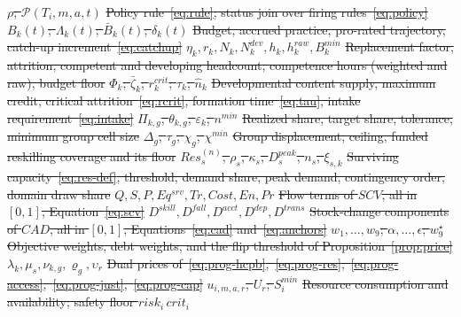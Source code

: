 \documentclass[utf8]{FrontiersinHarvard}
\providecommand{\DIFdel}[1]{{\protect\color{red}\sout{#1}}}                      %
\providecommand{\DIFdelFL}[1]{\DIFdel{#1}} %
\begin{document}
\DIFdelFL{$\rho$; $\mathcal{P}(T_i,m,a,t)$ }%
\DIFdelFL{Policy rule~\eqref{eq:rule}; status join over firing rules~\eqref{eq:policy}}%
\DIFdelFL{$B_k(t)$; $\Lambda_k(t)$; $\bar B_k(t)$; $\delta_k(t)$ }%
\DIFdelFL{Budget, accrued practice, pro-rated trajectory, catch-up increment~\eqref{eq:catchup}}%
\DIFdelFL{$\eta_k, r_k, N_k, N^{dev}_k, h_k, h^{raw}_k, B^{min}_k$ }%
\DIFdelFL{Replacement factor, attrition, competent and developing headcount, competence hours (weighted and raw), budget floor}%
\DIFdelFL{$\Phi_k$; $\bar\zeta_k$; $r^{crit}_k$; $\tau_k$; $\hat n_k$ }%
\DIFdelFL{Developmental content supply, maximum credit, critical attrition~\eqref{eq:rcrit}, formation time~\eqref{eq:tau}, intake requirement~\eqref{eq:intake}}%
\DIFdelFL{$\Pi_{k,g}$, $\theta_{k,g}$, $\varepsilon_k$, $n^{min}$ }%
\DIFdelFL{Realized share, target share, tolerance, minimum group cell size}%
\DIFdelFL{$\Delta_g$, $\tau_g$, $\chi_g$, $\chi^{min}$ }%
\DIFdelFL{Group displacement, ceiling, funded reskilling coverage and its floor}%
\DIFdelFL{$Res^{(n)}_s$, $\rho_s$, $\kappa_s$, $D^{peak}_s$, $n_s$, $\xi_{s,k}$ }%
\DIFdelFL{Surviving capacity~\eqref{eq:res-def}, threshold, demand share, peak demand, contingency order, domain draw share}%
\DIFdelFL{$Q,S,P,Eq^{srv},Tr,Cost,En,Pr$ }%
\DIFdelFL{Flow terms of $SCV$, all in $[0,1]$, Equation~\eqref{eq:scv}}%
\DIFdelFL{$D^{skill},D^{fall},D^{acct},D^{dep},D^{trans}$ }%
\DIFdelFL{Stock-change components of $CAD$, all in $[0,1]$, Equations~\eqref{eq:cad} and~\eqref{eq:anchors}}%
\DIFdelFL{$w_1,\ldots,w_9$; $\alpha,\ldots,\epsilon$; $w_9^\star$ }%
\DIFdelFL{Objective weights, debt weights, and the flip threshold of Proposition~\ref{prop:price}}%
\DIFdelFL{$\lambda_k,\mu_s,\nu_{k,g},\varrho_g,\upsilon_r$ }%
\DIFdelFL{Dual prices of~\eqref{eq:prog-hcpb},~\eqref{eq:prog-res},~\eqref{eq:prog-access},~\eqref{eq:prog-just},~\eqref{eq:prog-cap}}%
\DIFdelFL{$u_{i,m,a,r}$, $U_r$; $S^{min}_i$ }%
\DIFdelFL{Resource consumption and availability; safety floor $risk_i\,crit_i$}%
\end{document}
